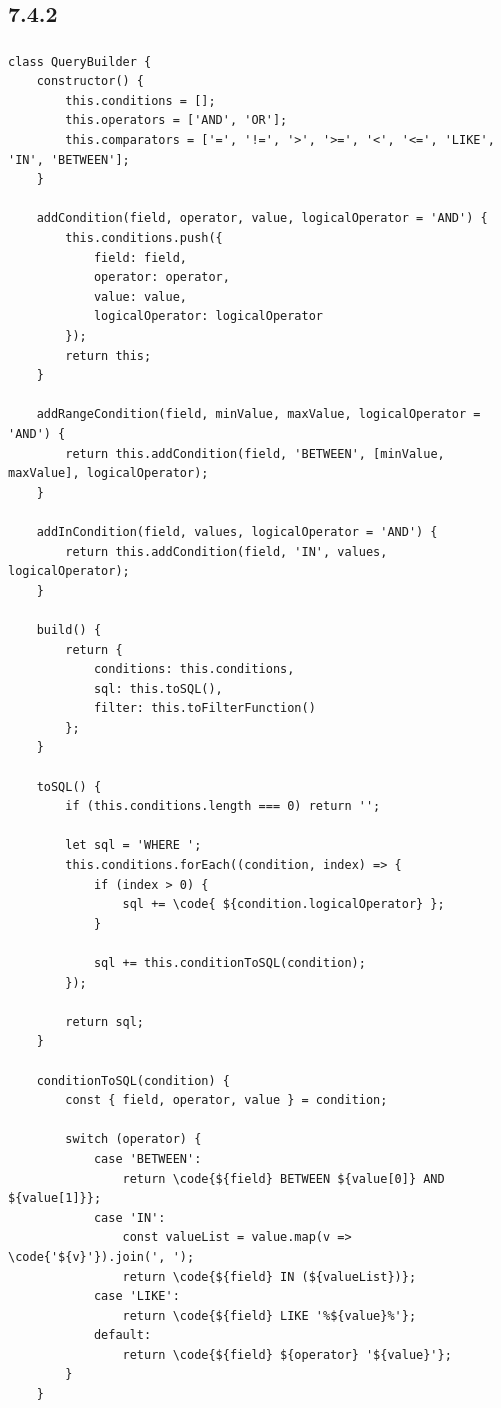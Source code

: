 \hypertarget{section-169}{%
\subsection{7.4.2}\label{section-169}}

\hypertarget{section-170}{%
\subsubsection{}\label{section-170}}

\begin{lstlisting}[style=javascript]
class QueryBuilder {
    constructor() {
        this.conditions = [];
        this.operators = ['AND', 'OR'];
        this.comparators = ['=', '!=', '>', '>=', '<', '<=', 'LIKE', 'IN', 'BETWEEN'];
    }
    
    addCondition(field, operator, value, logicalOperator = 'AND') {
        this.conditions.push({
            field: field,
            operator: operator,
            value: value,
            logicalOperator: logicalOperator
        });
        return this;
    }
    
    addRangeCondition(field, minValue, maxValue, logicalOperator = 'AND') {
        return this.addCondition(field, 'BETWEEN', [minValue, maxValue], logicalOperator);
    }
    
    addInCondition(field, values, logicalOperator = 'AND') {
        return this.addCondition(field, 'IN', values, logicalOperator);
    }
    
    build() {
        return {
            conditions: this.conditions,
            sql: this.toSQL(),
            filter: this.toFilterFunction()
        };
    }
    
    toSQL() {
        if (this.conditions.length === 0) return '';
        
        let sql = 'WHERE ';
        this.conditions.forEach((condition, index) => {
            if (index > 0) {
                sql += \code{ ${condition.logicalOperator} };
            }
            
            sql += this.conditionToSQL(condition);
        });
        
        return sql;
    }
    
    conditionToSQL(condition) {
        const { field, operator, value } = condition;
        
        switch (operator) {
            case 'BETWEEN':
                return \code{${field} BETWEEN ${value[0]} AND ${value[1]}};
            case 'IN':
                const valueList = value.map(v => \code{'${v}'}).join(', ');
                return \code{${field} IN (${valueList})};
            case 'LIKE':
                return \code{${field} LIKE '%${value}%'};
            default:
                return \code{${field} ${operator} '${value}'};
        }
    }
    

\end{lstlisting}
